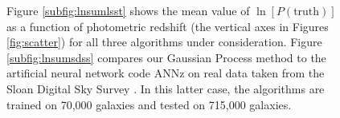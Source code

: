 \documentclass[useAMS,usenatbib,tightenlines,11pt,preprint]{aastex}
\begin{document}
\begin{figure}
\caption{
Figure \ref{subfig:lnsumlsst} shows the mean value of
$\ln[P(\text{truth})]$ as a function of photometric redshift (the vertical
axes in Figures \ref{fig:scatter}) for all
three algorithms under consideration.  
Figure \ref{subfig:lnsumsdss} compares our Gaussian Process method
to the artificial neural network code ANNz \cite{annz} on real
data taken from the Sloan Digital Sky Survey \cite{Abazagian:2008wr}.  
In this latter case, the
algorithms are trained on 70,000 galaxies and tested on 715,000 galaxies.
}
\label{fig:gp}
\end{figure}
\end{document}
